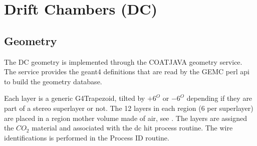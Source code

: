 \section{Drift Chambers (DC)}

\subsection{Geometry}

The DC geometry is implemented through the COATJAVA geometry service.
The service provides the geant4 definitions that are read by the GEMC perl api to build the geometry database.

Each layer is a generic G4Trapezoid, tilted by $+6^O$ or $-6^O$ depending if they are part of a stereo superlayer or not.
The 12 layers in each region (6 per superlayer) are placed in a region mother volume made of air, see .
The layers are assigned the $CO_2$ material and associated with the dc hit process routine.
The wire identifications is performed in the Process ID routine.

